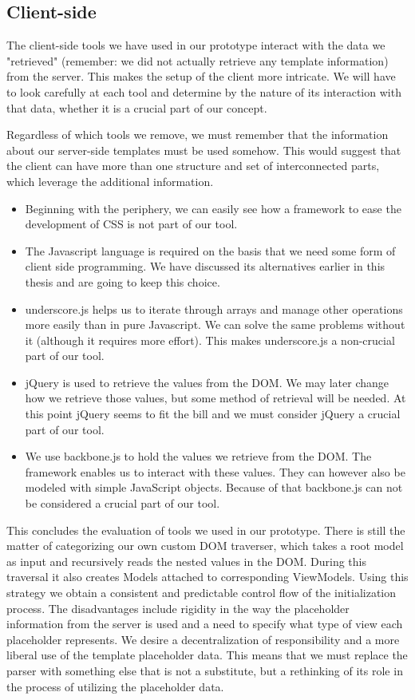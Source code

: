 \documentclass[thesis.tex]{subfiles}
\begin{document}
\subsection{Client-side}
The client-side tools we have used in our prototype interact with the data we
"retrieved" (remember: we did not actually retrieve any template information)
from the server. This makes the setup of the client more intricate. We will have
to look carefully at each tool and determine by the nature of its interaction
with that data, whether it is a crucial part of our concept.

Regardless of which tools we remove, we must remember that the information about
our server-side templates must be used somehow. This would suggest that the
client can have more than one structure and set of interconnected parts, which
leverage the additional information.

\begin{itemize}
\item Beginning with the periphery, we can easily see how a framework to ease
the development of CSS is not part of our tool.
\item The Javascript language is required on the basis that we need some form of
client side programming. We have discussed its alternatives earlier in this
thesis and are going to keep this choice.
\item underscore.js helps us to iterate through arrays and manage other
operations more easily than in pure Javascript. We can solve the same problems
without it (although it requires more effort). This makes underscore.js a
non-crucial part of our tool.
\item jQuery is used to retrieve the values from the DOM. We may later change
how we retrieve those values, but some method of retrieval will be needed.
At this point jQuery seems to fit the bill and we must consider jQuery a crucial
part of our tool.
\item We use backbone.js to hold the values we retrieve from the DOM. The
framework enables us to interact with these values. They can however also be
modeled with simple JavaScript objects. Because of that backbone.js can not be
considered a crucial part of our tool.
\end{itemize}

This concludes the evaluation of tools we used in our prototype. There is
still the matter of categorizing our own custom DOM traverser, which
takes a root model as input and recursively reads the nested values in the DOM.
During this traversal it also creates Models attached to corresponding
ViewModels.
Using this strategy we obtain a consistent and predictable control flow of the
initialization process. The disadvantages include rigidity in the way
the placeholder information from the server is used and a need to specify what
type of view each placeholder represents.
We desire a decentralization of responsibility and a more liberal use of
the template placeholder data. This means that we must replace the parser with
something else that is not a substitute, but a rethinking of its role in the
process of utilizing the placeholder data.
\end{document}
